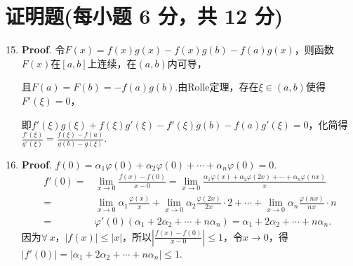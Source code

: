 \documentclass[../main.tex]{subfiles}
\begin{document}
\section{证明题(每小题 6 分，共 12 分)}
\begin{enumerate}
    \setcounter{enumi}{14}
    \item \textbf{Proof}. 令$F(x)=f(x)g(x)-f(x)g(b)-f(a)g(x)$，则函数$F(x)$在$[
                  a,b]$上连续，在$(a,b)$内可导，

          且$F(a)=F(b)=-f(a)g(b)$.由Rolle定理，存在$\xi\in(a,b)$使得$F'(\xi)=0$，

          即$f'(\xi)g(\xi)+f(\xi)g'(\xi)-f'(\xi)g(b)-f(a)g'(\xi)=0$，化简得$\frac{f'(\xi)}{g'(\xi)}
              =\frac{f(\xi)-f(a)}{g(b)-g(\xi)}$.

    \item \textbf{Proof}. $f(0)=\alpha_{1}\varphi(0)+\alpha_{2}\varphi(0)+\cdots
              +\alpha_{n}\varphi(0)=0$.
          \[
              \begin{aligned}
                  f'(0)= {} & \lim_{x\to0}\frac{f(x)-f(0)}{x-0}=\lim_{x\to0}\frac{\alpha_1\varphi(x)+\alpha_2\varphi(2x)+\cdots+\alpha_n\varphi(nx)}{x}                                  \\
                  = {}      & \lim_{x\to 0}\alpha_{1}\frac{\varphi(x)}{x}+\lim_{x\to0}\alpha_{2}\frac{\varphi(2x)}{2x}\cdot 2+\cdots+\lim_{x\to0}\alpha_{n}\frac{\varphi(nx)}{nx}\cdot n \\
                  = {}      & \varphi'(0)\left(\alpha_{1}+2\alpha_{2}+\cdots+n\alpha_{n}\right)=\alpha_{1}+2\alpha_{2}+\cdots+n\alpha_{n}.
              \end{aligned}
          \]
          因为$\forall\,x$，$|f(x)|\leq |x|$，所以$\left|\frac{f(x)-f(0)}{x-0}\right|
              \leq 1$，令$x\to0$，得$|f'(0)|=|\alpha_{1}+2\alpha_{2}+\cdots+n\alpha_{n}|\leq
              1$.
\end{enumerate}
\end{document}

